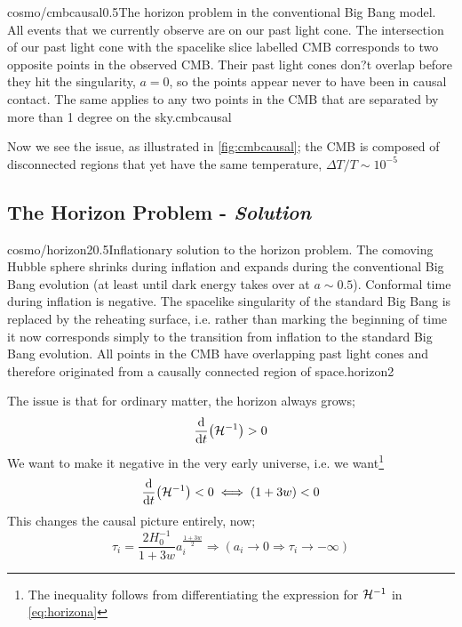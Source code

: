 \begin{mygraphic}{cosmo/cmbcausal}{0.5}{The horizon problem in the conventional Big Bang model. All events that we currently observe are on our past light cone. The intersection of our past light cone with the spacelike slice labelled CMB corresponds to two opposite points in the observed CMB. Their past light cones don?t overlap before they hit the singularity, $a = 0$, so the points appear never to have been in causal contact. The same applies to any two points in the CMB that are separated by more than 1 degree on the sky.}{cmbcausal}\end{mygraphic}
Now we see the issue, as illustrated in \autoref{fig:cmbcausal}; the CMB is composed of disconnected regions that yet have the same temperature, $\Delta T / T \sim 10^{-5}$
\subsection{The Horizon Problem - \emph{Solution}}
\begin{mygraphic}{cosmo/horizon2}{0.5}{Inflationary solution to the horizon problem. The comoving Hubble sphere shrinks during inflation and expands during the conventional Big Bang evolution (at least until dark energy takes over at $a \sim 0.5$). Conformal time during inflation is negative. The spacelike singularity of the standard Big Bang is replaced by the reheating surface, i.e. rather than marking the beginning of time it now corresponds simply to the transition from inflation to the standard Big Bang evolution. All points in the CMB have overlapping past light cones and therefore originated from a causally connected region of space.}{horizon2}\end{mygraphic}
The issue is that for ordinary matter, the horizon always grows;
\begin{equation}
\frac{\ud}{\ud t}\left(\hamilt^{-1}\right) > 0
\end{equation}
We want to make it negative in the very early universe, i.e. we want\footnote{The inequality follows from differentiating the expression for $\mathcal{H}^{-1}$ in \eqref{eq:horizona}}
\begin{equation}
\frac{\ud}{\ud t}\left(\hamilt^{-1}\right) < 0 \iff (1 + 3w) < 0
\end{equation}
This changes the causal picture entirely, now;
\begin{equation}
\tau_i = \frac{2H_0^{-1}}{1 + 3w}a_i^{\tfrac{1+3w}{2}} \Rightarrow \left(a_i \rightarrow 0 \Rightarrow \tau_i \rightarrow -\infty\right)
\end{equation}
